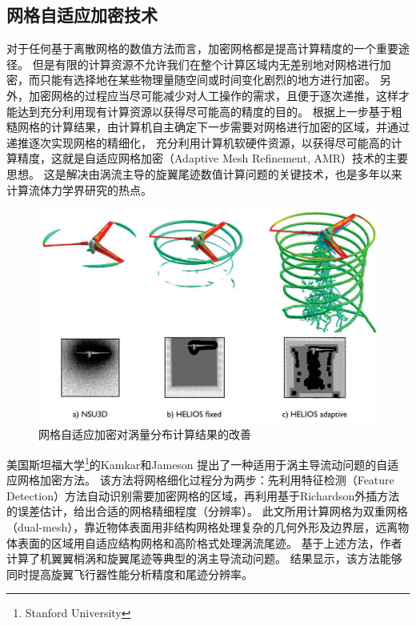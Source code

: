 \documentclass[doctor,openright,twoside,color]{buaathesis}
\begin{document}
\subsection{网格自适应加密技术}
对于任何基于离散网格的数值方法而言，加密网格都是提高计算精度的一个重要途径。
但是有限的计算资源不允许我们在整个计算区域内无差别地对网格进行加密，而只能有选择地在某些物理量随空间或时间变化剧烈的地方进行加密。
另外，加密网格的过程应当尽可能减少对人工操作的需求，且便于逐次递推，这样才能达到充分利用现有计算资源以获得尽可能高的精度的目的。
根据上一步基于粗糙网格的计算结果，由计算机自主确定下一步需要对网格进行加密的区域，并通过递推逐次实现网格的精细化，
充分利用计算机软硬件资源，以获得尽可能高的计算精度，这就是自适应网格加密（Adaptive Mesh Refinement, AMR）技术的主要思想。
这是解决由涡流主导的旋翼尾迹数值计算问题的关键技术，也是多年以来计算流体力学界研究的热点。
\begin{figure}[t!]
    \centering
    \includegraphics[height=0.3\textheight]{figures/adaptive.jpg}
    \caption{网格自适应加密对涡量分布计算结果的改善}
\end{figure}

美国斯坦福大学\footnote{Stanford University}的Kamkar和Jameson
提出了一种适用于涡主导流动问题的自适应网格加密方法。
该方法将网格细化过程分为两步：先利用特征检测（Feature Detection）方法自动识别需要加密网格的区域，再利用基于Richardson外插方法的误差估计，给出合适的网格精细程度（分辨率）。
此文所用计算网格为双重网格（dual-mesh），靠近物体表面用非结构网格处理复杂的几何外形及边界层，远离物体表面的区域用自适应结构网格和高阶格式处理涡流尾迹。
基于上述方法，作者计算了机翼翼梢涡和旋翼尾迹等典型的涡主导流动问题。
结果显示，该方法能够同时提高旋翼飞行器性能分析精度和尾迹分辨率。
\end{document}
